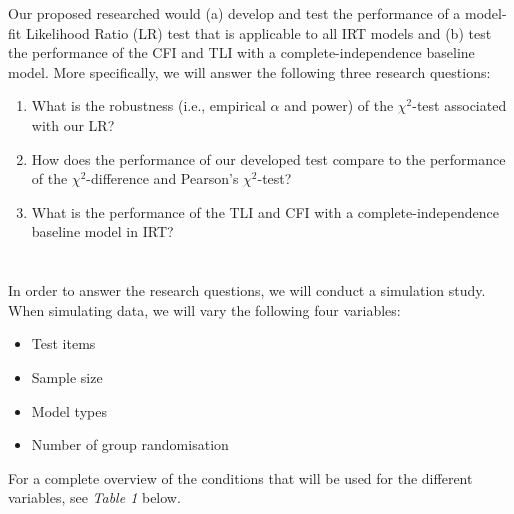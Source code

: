 \documentclass{article}
\begin{document}
\indent Our proposed researched would (a) develop and test the performance of a model-fit Likelihood Ratio (LR) test that is applicable to all IRT models and (b) test the performance of the CFI and TLI with a complete-independence baseline model. More specifically, we will answer the following three research questions:
\begin{enumerate}
\item What is the robustness (i.e., empirical $\alpha$ and power) of the $\chi^2$-test associated with our LR?
\item How does the performance of our developed test compare to the performance of the $\chi^2$-difference and Pearson's $\chi^2$-test?
\item What is the performance of the TLI and CFI with a complete-independence baseline model in IRT?
\end{enumerate}

\section{}
In order to answer the research questions, we will conduct a simulation study. When simulating data, we will vary the following four variables:

\begin{itemize}
\item Test items
\item Sample size
\item Model types
\item Number of group randomisation
\end{itemize}

\noindent For a complete overview of the conditions that will be used for the different variables, see \textit{Table 1} below. \\ \\ \\ \\ \\ 
\end{document}
